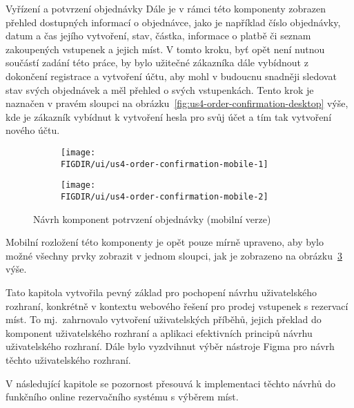 \begin{subsection}{Vyřízení a potvrzení objednávky}
    Dále je v rámci této komponenty zobrazen přehled dostupných informací o objednávce, jako je například číslo objednávky, datum a čas jejího vytvoření, stav, částka, informace o platbě či seznam zakoupených vstupenek a jejich míst.
    V tomto kroku, byť opět není nutnou součástí zadání této práce, by bylo užitečné zákazníka dále vybídnout z dokončení registrace a vytvoření účtu, aby mohl v budoucnu snadněji sledovat stav svých objednávek a měl přehled o svých vstupenkách.
    Tento krok je naznačen v pravém sloupci na obrázku~\ref{fig:us4-order-confirmation-desktop} výše, kde je zákazník vybídnut k vytvoření hesla pro svůj účet a tím tak vytvoření nového účtu.

    \begin{figure}[H]
        \centering
        \begin{subfigure}{0.4\textwidth}
            \texttt{[image: \\FIGDIR/ui/us4-order-confirmation-mobile-1]}
            \label{fig:us4-order-confirmation-mobile-1}
        \end{subfigure}
        \hfill
        \begin{subfigure}{0.4\textwidth}
            \texttt{[image: \\FIGDIR/ui/us4-order-confirmation-mobile-2]}
            \label{fig:us4-order-confirmation-mobile-2}
        \end{subfigure}

        \caption{Návrh komponent potrvzení objednávky (mobilní verze)}
        \label{fig:us4-order-confirmation-mobile}
    \end{figure}

    Mobilní rozložení této komponenty je opět pouze mírně upraveno, aby bylo možné všechny prvky zobrazit v jednom sloupci, jak je zobrazeno na obrázku~\ref{fig:us4-order-confirmation-mobile} výše.

    Tato kapitola vytvořila pevný základ pro pochopení návrhu uživatelského rozhraní, konkrétně v kontextu webového řešení pro prodej vstupenek s rezervací míst.
    To mj.\ zahrnovalo vytvoření uživatelských příběhů, jejich překlad do komponent uživatelského rozhraní a aplikaci efektivních principů návrhu uživatelského rozhraní.
    Dále bylo vyzdvihnut výběr nástroje Figma pro návrh těchto uživatelského rozhraní.

    V následující kapitole se pozornost přesouvá k implementaci těchto návrhů do funkčního online rezervačního systému s výběrem míst.
\end{subsection}
